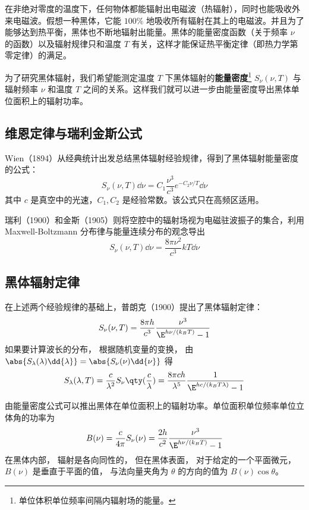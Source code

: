 
在非绝对零度的温度下，任何物体都能辐射出电磁波（热辐射），同时也能吸收外来电磁波。假想一种黑体，它能 $100\%$ 地吸收所有辐射在其上的电磁波。并且为了能够达到热平衡，黑体也不断地辐射出能量。黑体的能量密度函数（关于频率 $\nu$ 的函数）以及辐射规律只和温度 $T$ 有关，这样才能保证热平衡定律（即热力学第零定律）的满足。

为了研究黑体辐射，我们希望能测定温度 $T$ 下黑体辐射的\textbf{能量密度}\footnote{单位体积单位频率间隔内辐射场的能量。} $S_\nu(\nu,T)$ 与辐射频率 $\nu$ 和温度 $T$ 之间的关系。这样我们就可以进一步由能量密度导出黑体单位面积上的辐射功率。

\subsection{维恩定律与瑞利金斯公式}
Wien（1894）从经典统计出发总结黑体辐射经验规律，得到了黑体辐射能量密度的公式：
\begin{equation}
S_\nu(\nu,T)\dd \nu=C_1 \frac{\nu^3}{c^3}e^{-C_2\nu/T}\dd \nu
\end{equation}
其中 $c$ 是真空中的光速，$C_1,C_2$ 是经验常数。该公式只在高频区适用。

瑞利（1900）和金斯（1905）则将空腔中的辐射场视为电磁驻波振子的集合，利用 Maxwell-Boltzmann 分布律与能量连续分布的观念导出
\begin{equation}
S_\nu(\nu,T)\dd \nu=\frac{8\pi\nu^2}{c^3}kT\dd \nu
\end{equation}


\subsection{黑体辐射定律}
在上述两个经验规律的基础上，普朗克（1900）提出了黑体辐射定律：
\begin{equation}
S_\nu(\nu,T) = \frac{8\pi h}{c^3}\frac{\nu^3}{\E^{h\nu/(k_B T)} - 1}
\end{equation}
如果要计算波长的分布， 根据随机变量的变换， 由 $\abs{S_\lambda(\lambda) \dd{\lambda}} = \abs{S_\nu(\nu)\dd{\nu}}$ 得
\begin{equation}\label{eq_BBdLaw_1}
S_\lambda(\lambda,T) = \frac{c}{\lambda^2}S_\nu\qty(\frac{c}{\lambda}) =
\frac{8\pi ch}{\lambda^5} \frac{1}{\E^{hc/(k_B T\lambda)} - 1}
\end{equation}

由能量密度公式可以推出黑体在单位面积上的辐射功率。单位面积单位频率单位立体角的功率为
\begin{equation}\label{eq_BBdLaw_2}
B(\nu) = \frac{c}{4\pi}S_\nu(\nu) = \frac{2h}{c^2} \frac{\nu^3}{\E^{h\nu/(k_B T)} - 1}
\end{equation}
在黑体内部， 辐射是各向同性的， 但在黑体表面， 对于给定的一个平面微元， $B(\nu)$ 是垂直于平面的值， 与法向量夹角为 $\theta$ 的方向的值为 $B(\nu)\cos\theta$。

